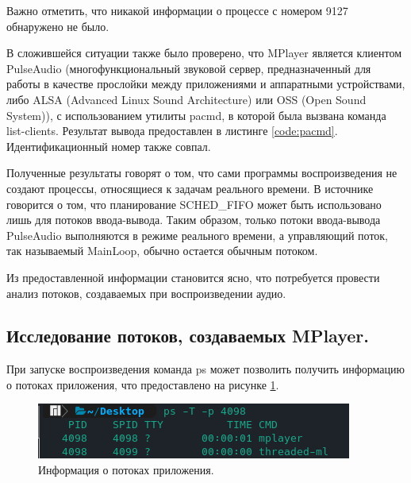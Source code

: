Важно отметить, что никакой информации о процессе с номером 9127 обнаружено не было.

В сложившейся ситуации также было проверено, что MPlayer является клиентом PulseAudio (многофункциональный звуковой сервер, предназначенный для работы в качестве прослойки между приложениями и аппаратными устройствами, либо ALSA (Advanced Linux Sound Architecture) или OSS (Open Sound System)), с использованием утилиты pacmd, в которой была вызвана команда list-clients. Результат вывода предоставлен в листинге \ref{code:pacmd}. Идентификационный номер также совпал.


Полученные результаты говорят о том, что сами программы воспроизведения не создают процессы, относящиеся к задачам реального времени. В источнике \cite{hackerNews} говорится о том, что планирование SCHED\_FIFO может быть использовано лишь для потоков ввода-вывода. Таким образом, только потоки ввода-вывода PulseAudio выполняются в режиме реального времени, а управляющий поток, так называемый MainLoop, обычно остается обычным потоком.

Из предоставленной информации становится ясно, что потребуется провести анализ потоков, создаваемых при воспроизведении аудио.

\subsection{Исследование потоков, создаваемых MPlayer. }
При запуске воспроизведения команда ps может позволить получить информацию о потоках приложения, что предоставлено на рисунке \ref{fig:psThreads}.

\begin{figure}[H]
	\centering
	\includegraphics[scale=0.8]{img/psThreads.png}
	\caption{Информация о потоках приложения. }
	\label{fig:psThreads}
\end{figure}

